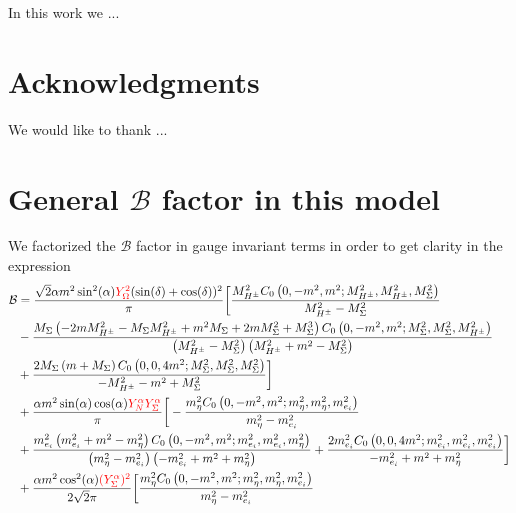 \documentclass[12pt,letterpaper]{article}
\begin{document}
In this work we ...


         

 

\section{Acknowledgments}
We would like to thank ...

\appendix

\section{General $\mathcal{B}$ factor in this model}
\label{app:B-factor}

We factorized the $\mathcal{B}$ factor in gauge invariant terms in order to get clarity in the expression
\begin{align}
\label{eq:B}
\mathcal{B} &=
\frac{ \sqrt{2} \alpha  m^2 \sin ^2(\alpha ){\color{red}Y_{\Omega }^2} (\sin (\delta )+\cos (\delta ))^2}{\pi }
\bigg[
\frac{M_{H^{\pm }}^2 C_0\left(0,-m^2,m^2;M_{H^{\pm }}^2,M_{H^{\pm }}^2,M_{\Sigma }^2\right)}{M_{H^{\pm }}^2-M_{\Sigma }^2}\nonumber\\
&-\frac{M_{\Sigma } \left(-2 m M_{H^{\pm }}^2-M_{\Sigma } M_{H^{\pm }}^2+m^2 M_{\Sigma }+2 m
   M_{\Sigma }^2+M_{\Sigma }^3\right) C_0\left(0,-m^2,m^2;M_{\Sigma }^2,M_{\Sigma }^2,M_{H^{\pm }}^2\right)}{\left(M_{H^{\pm }}^2-M_{\Sigma }^2\right) \left(M_{H^{\pm }}^2+m^2-M_{\Sigma }^2\right)}\nonumber\\
&+\frac{2 M_{\Sigma }
   \left(m+M_{\Sigma }\right) C_0\left(0,0,4 m^2;M_{\Sigma }^2,M_{\Sigma }^2,M_{\Sigma }^2\right)}{-M_{H^{\pm }}^2-m^2+M_{\Sigma }^2}
\bigg]\nonumber\\
&+
\frac{\alpha  m^2 \sin (\alpha ) \cos (\alpha ) {\color{red}Y_N^{\alpha } Y_{\Sigma }^{\alpha }}}{\pi }
\bigg[
-\frac{m_{\eta }^2 C_0\left(0,-m^2,m^2;m_{\eta }^2,m_{\eta }^2,m_{e_i}^2\right)}{m_{\eta }^2-m_{e_i}^2}\nonumber\\
&+ \frac{m_{e_i}^2 \left(m_{e_i}^2+m^2-m_{\eta }^2\right) C_0\left(0,-m^2,m^2;m_{e_i}^2,m_{e_i}^2,m_{\eta
   }^2\right)}{\left(m_{\eta }^2-m_{e_i}^2\right) \left(-m_{e_i}^2+m^2+m_{\eta }^2\right)}+\frac{2 m_{e_i}^2 C_0\left(0,0,4 m^2;m_{e_i}^2,m_{e_i}^2,m_{e_i}^2\right)}{-m_{e_i}^2+m^2+m_{\eta }^2}
\bigg]\nonumber\\
&+
\frac{\alpha  m^2 \cos ^2(\alpha ) {\color{red}(Y_{\Sigma }^{\alpha })^2}}{2\sqrt{2} \pi }
\bigg[
\frac{m_{\eta }^2 C_0\left(0,-m^2,m^2;m_{\eta }^2,m_{\eta }^2,m_{e_i}^2\right)}{m_{\eta }^2-m_{e_i}^2}\nonumber\\

\end{align}
\end{document}
